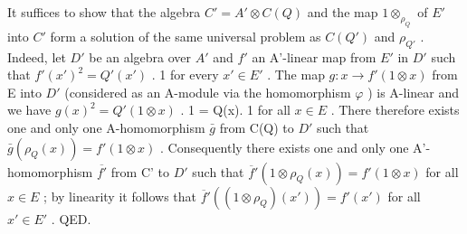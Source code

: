 It suffices to show that the algebra \(C' = A' \otimes C(Q)\) and the map \(1 \otimes_{\rho_{Q}}\) of \(E'\) into \(C'\) form a solution of the same universal problem as \(C(Q')\) and \(\rho_{Q'}\) . Indeed, let \(D'\) be an algebra over \(A'\) and \(f'\) an A'-linear map from \(E'\) in \(D'\) such that \(f'(x')^{2} = Q'(x')\) . 1 for every \(x' \in E'\) . The map \(g : x \to f'(1 \otimes x)\) from E into \(D'\) (considered as an A-module via the homomorphism \(\varphi\) ) is A-linear and we have \(g(x)^{2} = Q'(1 \otimes x)\) . 1 = Q(x). 1 for all \(x \in E\) . There therefore exists one and only one A-homomorphism \(\bar{g}\) from C(Q) to \(D'\) such that \(\bar{g}(\rho_{Q}(x)) = f'(1 \otimes x)\) . Consequently there exists one and only one A'-homomorphism \(\overline{f'}\) from C' to \(D'\) such that \(\overline{f}'(1 \otimes \rho_{Q}(x)) = f'(1 \otimes x)\) for all \(x \in E\) ; by linearity it follows that \(\overline{f}'((1 \otimes \rho_{Q})(x')) = f'(x')\) for all \(x' \in E'\) . QED.

